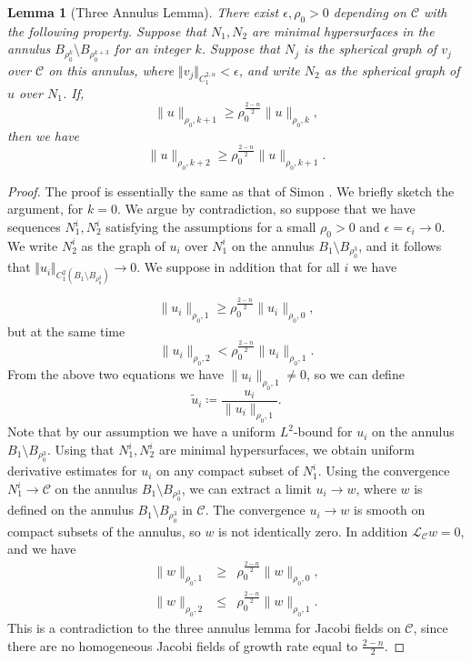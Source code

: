 \documentclass[12pt, reqno ]{amsart}
\newtheorem{lemma}[theorem]{Lemma}
\numberwithin{equation}{section}
\begin{document}
\begin{lemma}[Three Annulus Lemma]\label{prelim:ThreeAnnulusLemma}
There exist $\epsilon, \rho_0 > 0$ depending on $\mathcal{C}$ with the following property. Suppose that $N_1, N_2$ are minimal hypersurfaces in the annulus $B_{\rho_0^k}\setminus B_{\rho_0^{k+3}}$ for an integer $k$. Suppose that $N_j$ is the spherical graph of $v_j$ over $\mathcal{C}$ on this annulus, where $\Vert v_j\Vert_{C^{2,\alpha}_1} < \epsilon$, and write $N_2$ as the spherical graph of $u$ over $N_1$. If,
$$\|u\|_{\rho_0, k+1}\geq \rho_0^{\frac{2-n}{2}} \|u\|_{\rho_0, k}, $$
then we have
$$ \|u\|_{\rho_0, k+2}\geq \rho_0^{\frac{2-n}{2}} \| u\|_{\rho_0, k+1}.$$
\end{lemma}
\begin{proof}

The proof is essentially the same as that of Simon \cite[Part II Lemma 3.3]{simon1983isolated}. We briefly sketch the argument, for $k=0$. We argue by contradiction, so suppose that we have sequences $N^i_1, N^i_2$ satisfying the assumptions for a small $\rho_0 > 0$ and $\epsilon = \epsilon_i \to 0$. We write $N^i_2$ as the graph of $u_i$ over $N^i_1$ on the annulus $B_1\setminus B_{\rho_0^3}$, and it follows that $\Vert u_i\Vert_{C^2_1(B_1\setminus B_{\rho_0^3})} \to 0$. We suppose in addition that for all $i$ we have

\[
    \|u_i\|_{\rho_0, 1}\geq \rho_0^{\frac{2-n}{2}} \|u_i\|_{\rho_0, 0},
\]
but at the same time 
\[ 
    \|u_i\|_{\rho_0, 2} <  \rho_0^{\frac{2-n}{2}} \|u_i\|_{\rho_0, 1}.
\]
From the above two equations we have $\|u_i\|_{\rho_0, 1}\neq 0$, so we can define
$$ \tilde u_i\coloneqq \frac{u_i}{\|u_i\|_{\rho_0, 1}}.$$
Note that by our assumption we have a uniform $L^2$-bound for $u_i$ on the annulus $B_1\setminus B_{\rho_0^3}$. 
Using that $N^i_1, N^i_2$ are minimal hypersurfaces, we obtain uniform derivative estimates for $u_i$ on any compact subset of $N^i_1$. Using the convergence $N^i_1 \to \mathcal{C}$ on the annulus $B_1\setminus B_{\rho_0^3}$, we can extract a limit $u_i \to w$, where $w$ is defined on the annulus $B_1\setminus B_{\rho_0^3}$ in $\mathcal{C}$. The convergence $u_i\to w$ is smooth on compact subsets of the annulus, so $w$ is not identically zero. In addition $\mathcal{L}_\mathcal{C} w=0$, and we have
\begin{eqnarray*}
    \| w\|_{\rho_0, 1} &\geq& \rho_0^{\frac{2-n}{2}} \|w\|_{\rho_0, 0}, \\
    \|w\|_{\rho_0, 2} &\leq& \rho_0^{\frac{2-n}{2}}\|w\|_{\rho_0, 1}.
\end{eqnarray*}
This is a contradiction to the three annulus lemma for Jacobi fields on $\mathcal C$, since there are no homogeneous Jacobi fields of growth rate equal to $\frac{2-n}{2}$. 
\end{proof}
\end{document}
